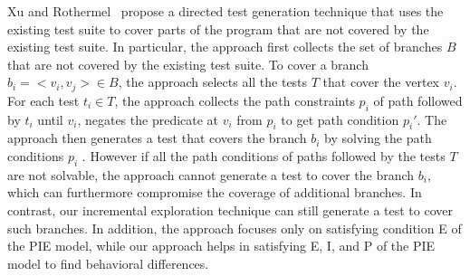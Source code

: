 Xu and Rothermel~\cite{xu-directed} propose a directed test generation technique that uses 
the existing test suite to cover parts of the program that are not covered by 
the existing test suite. In particular, the approach first collects 
the set of branches $B$ that are not covered by the existing test suite. To cover a branch 
$b_i =<v_i,v_j> \in B$, the approach selects all the tests $T$ that cover the vertex $v_i$. 
For each test $t_i \in T$, the approach collects the path constraints $p_i$ of path followed by $t_i$ until $v_i$, 
negates the predicate at $v_i$ from $p_i$ to get path condition $p_i'$.
The approach then generates a test that covers the branch 
$b_i$ by solving the path conditions $p_i$ . 
However if all the path conditions of paths followed by the tests $T$ are not solvable, the approach cannot 
generate a test to cover the branch $b_i$, which can furthermore compromise the coverage of additional branches.
In contrast, our incremental exploration technique can still generate a test to cover such branches.
In addition, the approach focuses only on satisfying condition E of the PIE model, while our approach
helps in satisfying E, I, and P of the PIE model to find behavioral differences.

%



